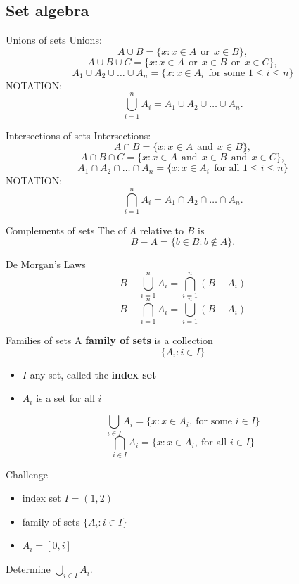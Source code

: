 \documentclass{beamer}
\begin{document}
\subsection{Set algebra}

\begin{frame}{Unions of sets}
Unions:
\pause
$$A\cup B = \{x: x\in A\ \ \text{or}\ \ x\in B\},$$
\pause
$$A\cup B\cup C = \{x: x\in A\ \ \text{or}\ \ x\in B\ \ \text{or}\ \ x\in C\},$$
\pause
$$A_1\cup A_2\cup \dots \cup A_n = \{x: x\in A_i\ \ \text{for some $1\leq i\leq n$}\}$$
\pause
{\color{red}NOTATION:}
$$\bigcup_{i=1}^n A_i = A_1\cup A_2\cup \dots \cup A_n.$$
\end{frame}

\begin{frame}{Intersections of sets}
Intersections:
\pause
$$A\cap B = \{x: x\in A\ \ \text{and}\ \ x\in B\},$$
\pause
$$A\cap B\cap C = \{x: x\in A\ \ \text{and}\ \ x\in B\ \ \text{and}\ \ x\in C\},$$
\pause
$$A_1\cap A_2\cap \dots \cap A_n = \{x: x\in A_i\ \ \text{for all $1\leq i\leq n$}\}$$
\pause
{\color{red}NOTATION:}
$$\bigcap_{i=1}^n A_i = A_1\cap A_2\cap \dots \cap A_n.$$
\end{frame}

\begin{frame}{Complements of sets}
\pause
The  of $A$ relative to $B$ is
$$B-A = \{b\in B: b\notin A\}.$$
\pause
\begin{thm}{De Morgan's Laws}
\pause
$$B-\bigcup_{i=1}^n A_i = \bigcap_{i=1}^n (B-A_i)$$
\pause
$$B-\bigcap_{i=1}^n A_i = \bigcup_{i=1}^n (B-A_i)$$
\end{thm}
\end{frame}


\begin{frame}{Families of sets}
A \textbf{family of sets} is a collection
$$\{A_i: i\in I\}$$
\begin{itemize}
\pause
\item $I$ any set, called the \textbf{index set}
\pause
\item $A_i$ is a set for all $i$
\end{itemize}
\pause
$$\bigcup_{i\in I} A_i = \{x: x\in A_i,\ \text{for some $i\in I$}\}$$
\pause
$$\bigcap_{i\in I} A_i = \{x: x\in A_i,\ \text{for all $i\in I$}\}$$
\end{frame}

\begin{frame}{Challenge}
\begin{itemize}
\item index set $I = (1,2)$
\item family of sets $\{A_i: i\in I\}$
\item $A_i = [0,i]$
\end{itemize}
\begin{prob}
Determine $\bigcup_{i\in I} A_i$.
\end{prob}
\end{frame}
\end{document}

